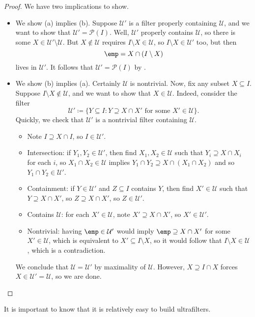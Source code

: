 \documentclass[../notes.tex]{subfiles}
\begin{document}
\begin{proof}
	We have two implications to show.
	\begin{itemize}
		\item We show (a) implies (b). Suppose $\mathcal U'$ is a filter properly containing $\mathcal U$, and we want to show that $\mathcal U'=\mathcal P(I)$. Well, $\mathcal U'$ properly contains $\mathcal U$, so there is some $X\in\mathcal U'\setminus\mathcal U$. But $X\notin\mathcal U$ requires $I\setminus X\in\mathcal U$, so $I\setminus X\in\mathcal U'$ too, but then
		\[\emp=X\cap(I\setminus X)\]
		lives in $\mathcal U'$. It follows that $\mathcal U'=\mathcal P(I)$ by .
		\item We show (b) implies (a). Certainly $\mathcal U$ is nontrivial. Now, fix any subset $X\subseteq I$. Suppose $I\setminus X\notin\mathcal U$, and we want to show that $X\in\mathcal U$. Indeed, consider the filter
		\[\mathcal U'\coloneqq\{Y\subseteq I:Y\supseteq X\cap X'\text{ for some }X'\in\mathcal U\}.\]
		Quickly, we check that $\mathcal U'$ is a nontrivial filter containing $\mathcal U$.
		\begin{itemize}
			\item Note $I\supseteq X\cap I$, so $I\in\mathcal U'$.
			\item Intersection: if $Y_1,Y_2\in\mathcal U'$, then find $X_1,X_2\in\mathcal U$ such that $Y_i\supseteq X\cap X_i$ for each $i$, so $X_1\cap X_2\in\mathcal U$ implies $Y_1\cap Y_2\supseteq X\cap(X_1\cap X_2)$ and so $Y_1\cap Y_2\in\mathcal U'$.
			\item Containment: if $Y\in\mathcal U'$ and $Z\subseteq I$ contains $Y$, then find $X'\in\mathcal U$ such that $Y\supseteq X\cap X'$, so $Z\supseteq X\cap X'$, so $Z\in\mathcal U'$.
			\item Contains $\mathcal U$: for each $X'\in\mathcal U$, note $X'\supseteq X\cap X'$, so $X'\in\mathcal U'$.
			\item Nontrivial: having $\emp\in\mathcal U'$ would imply $\emp\supseteq X\cap X'$ for some $X'\in\mathcal U$, which is equivalent to $X'\subseteq I\setminus X$, so it would follow that $I\setminus X\in\mathcal U$, which is a contradiction.
		\end{itemize}
		We conclude that $\mathcal U=\mathcal U'$ by maximality of $\mathcal U$. However, $X\supseteq I\cap X$ forces $X\in\mathcal U'=\mathcal U$, so we are done.
		\qedhere
	\end{itemize}
\end{proof}
It is important to know that it is relatively easy to build ultrafilters.
\end{document}
